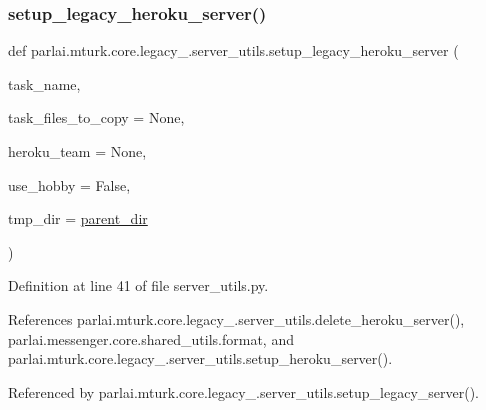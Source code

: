 \subsubsection{\texorpdfstring{setup\+\_\+legacy\+\_\+heroku\+\_\+server()}{setup\_legacy\_heroku\_server()}}
{\footnotesize\ttfamily def parlai.\+mturk.\+core.\+legacy\+\_.\+server\+\_\+utils.\+setup\+\_\+legacy\+\_\+heroku\+\_\+server (\begin{DoxyParamCaption}\item[{}]{task\+\_\+name,  }\item[{}]{task\+\_\+files\+\_\+to\+\_\+copy = {\ttfamily None},  }\item[{}]{heroku\+\_\+team = {\ttfamily None},  }\item[{}]{use\+\_\+hobby = {\ttfamily False},  }\item[{}]{tmp\+\_\+dir = {\ttfamily \hyperlink{namespaceparlai_1_1mturk_1_1core_1_1legacy__2018_1_1server__utils_a6a871d2f8e5c0768a82ab8fa2e7fadae}{parent\+\_\+dir}} }\end{DoxyParamCaption})}



Definition at line 41 of file server\+\_\+utils.\+py.



References parlai.\+mturk.\+core.\+legacy\+\_.\+server\+\_\+utils.\+delete\+\_\+heroku\+\_\+server(), parlai.\+messenger.\+core.\+shared\+\_\+utils.\+format, and parlai.\+mturk.\+core.\+legacy\+\_.\+server\+\_\+utils.\+setup\+\_\+heroku\+\_\+server().



Referenced by parlai.\+mturk.\+core.\+legacy\+\_.\+server\+\_\+utils.\+setup\+\_\+legacy\+\_\+server().

